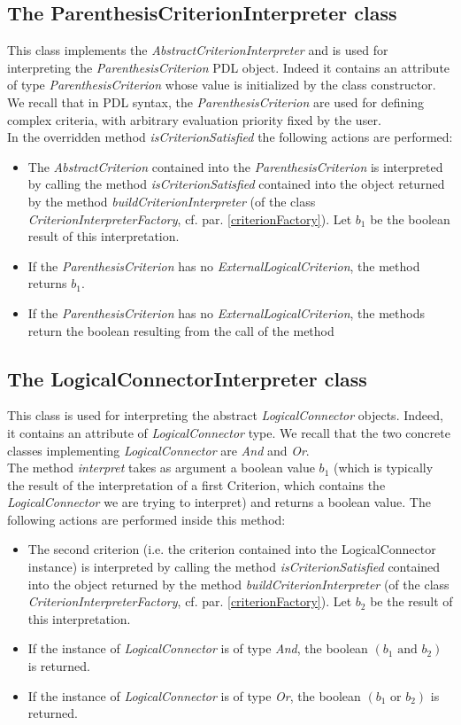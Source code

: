 \documentclass[a4paper,11pt] {ivoa}
\begin{document}
\subsection{The ParenthesisCriterionInterpreter class}
This class implements the {\it AbstractCriterionInterpreter} and is used for interpreting the {\it ParenthesisCriterion} PDL object. Indeed it contains an attribute of type {\it ParenthesisCriterion} whose value is initialized by the class constructor. We recall that in PDL syntax, the {\it ParenthesisCriterion} are used for defining complex criteria, with arbitrary evaluation priority fixed by the user. \\
In the overridden method {\it isCriterionSatisfied} the following actions are performed:
\begin{itemize}
\item The {\it AbstractCriterion} contained into the {\it ParenthesisCriterion} is interpreted  by calling the method {\it isCriterionSatisfied} contained into the object returned by the method {\it buildCriterionInterpreter} (of the class {\it CriterionInterpreterFactory}, cf. par. \ref{criterionFactory}). Let $b_1$ be the boolean result of this interpretation.
\item If the {\it ParenthesisCriterion} has no {\it ExternalLogicalCriterion}, the method returns $b_1$.
\item If the {\it ParenthesisCriterion} has no {\it ExternalLogicalCriterion}, the methods return the boolean resulting from the call of the method 
\end{itemize}

\subsection{The LogicalConnectorInterpreter class}\label{logicalConnectorInt}
This class is used for interpreting the abstract {\it LogicalConnector} objects. Indeed, it contains an attribute of {\it LogicalConnector} type. We recall that the two concrete classes implementing {\it LogicalConnector} are {\it And} and {\it Or}.\\
The method {\it interpret} takes as argument a boolean value $b_1$ (which is  typically the result of the interpretation of a first Criterion, which contains the {\it LogicalConnector} we are trying to interpret) and returns a boolean value. The following actions are performed inside this method:
\begin{itemize}
\item The second criterion (i.e. the criterion contained into the {LogicalConnector} instance) is interpreted by calling the method {\it isCriterionSatisfied} contained into the object returned by the method {\it buildCriterionInterpreter} (of the class {\it CriterionInterpreterFactory}, cf. par. \ref{criterionFactory}). Let $b_2$ be the result of this interpretation.
\item If the instance of {\it LogicalConnector} is of type {\it And}, the boolean $(b_1 \mbox{ and } b_2)$ is returned.
\item If the instance of {\it LogicalConnector} is of type {\it Or}, the boolean $(b_1 \mbox{ or } b_2)$ is returned.
\end{itemize}
\end{document}

